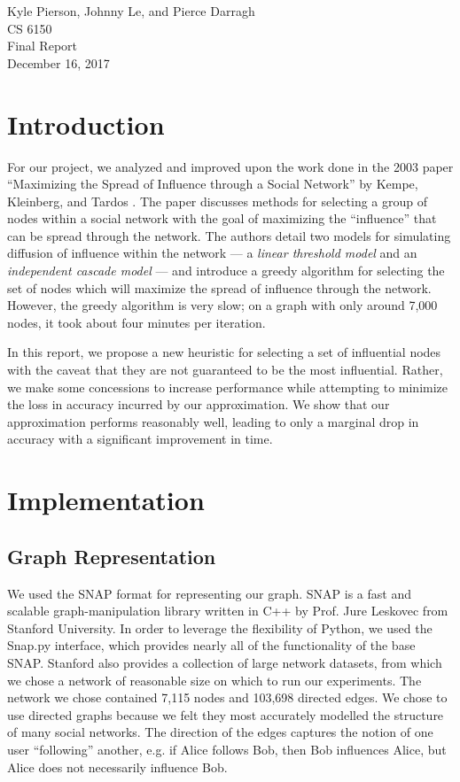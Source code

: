 \documentclass{article}
\begin{document}
\begin{flushright}
Kyle Pierson, Johnny Le, and Pierce Darragh\\
CS 6150\\
Final Report\\
December 16, 2017
\end{flushright}

\section{Introduction}
  For our project, we analyzed and improved upon the work done in the 2003 paper ``Maximizing the Spread of Influence through a Social Network'' by Kempe, Kleinberg, and Tardos \cite{kempe}. The paper discusses methods for selecting a group of nodes within a social network with the goal of maximizing the ``influence'' that can be spread through the network. The authors detail two models for simulating diffusion of influence within the network --- a \emph{linear threshold model} and an \emph{independent cascade model} --- and introduce a greedy algorithm for selecting the set of nodes which will maximize the spread of influence through the network. However, the greedy algorithm is very slow; on a graph with only around 7,000 nodes, it took about four minutes per iteration.

  In this report, we propose a new heuristic for selecting a set of influential nodes with the caveat that they are not guaranteed to be the most influential. Rather, we make some concessions to increase performance while attempting to minimize the loss in accuracy incurred by our approximation. We show that our approximation performs reasonably well, leading to only a marginal drop in accuracy with a significant improvement in time.

\section{Implementation}

  \subsection{Graph Representation}
    We used the SNAP format \cite{snap} for representing our graph.  SNAP is a fast and scalable graph-manipulation library written in C++ by Prof. Jure Leskovec from Stanford University.  In order to leverage the flexibility of Python, we used the Snap.py interface, which provides nearly all of the functionality of the base SNAP.  Stanford also provides a collection of large network datasets, from which we chose a network of reasonable size on which to run our experiments.  The network we chose contained 7,115 nodes and 103,698 directed edges.  We chose to use directed graphs because we felt they most accurately modelled the structure of many social networks.  The direction of the edges captures the notion of one user ``following'' another, e.g. if Alice follows Bob, then Bob influences Alice, but Alice does not necessarily influence Bob.
\end{document}
